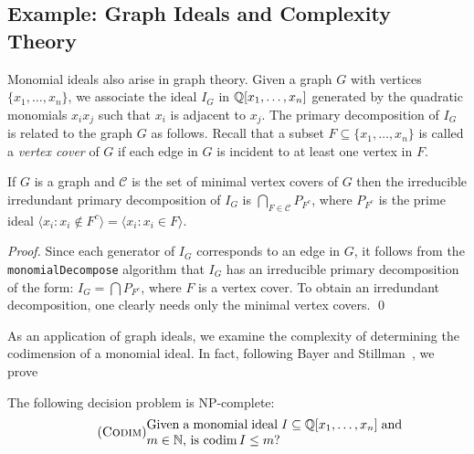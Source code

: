 \subsection*{Example: Graph Ideals and Complexity Theory}

Monomial ideals also arise in graph theory.  Given a graph $G$ with
vertices $\{x_{1}, \dotsc, x_{n}\}$, we associate the
ideal $I_{G}$ in ${\mathbb Q}[x_{1}, \dotsc, x_{n}]$
generated by the quadratic monomials $x_{i}x_{j}$ such that $x_{i}$ is
adjacent to $x_{j}$.  The primary decomposition of $I_{G}$ is related to
the graph $G$ as follows.  Recall that a subset $F \subseteq \{x_{1},
\dotsc, x_{n}\}$ is called a {\em vertex cover} of $G$ if each edge in $G$ is incident to at least
one vertex in $F$.

\begin{lemma} \label{lem:graphideal}
If $G$ is a graph and $\mathcal{C}$ is the set of minimal vertex
covers of $G$ then the irreducible irredundant primary
decomposition of $I_{G}$ is $\bigcap_{F
\in \mathcal{C}} P_{F^{c}}$, where $P_{F^{c}}$ is the prime ideal
$\langle x_{i} : x_{i} \not\in F^{c} \rangle =
\langle x_{i} : x_{i} \in F \rangle$.
\end{lemma}

\begin{proof}
Since each generator of $I_{G}$ corresponds to an edge in $G$, it
follows from the {\tt monomialDecompose} algorithm that $I_{G}$ has an
irreducible primary decomposition of the form: $I_{G} = \bigcap
P_{F^{c}}$, where $F$ is a vertex cover.  To obtain an
irredundant decomposition, one clearly needs only the minimal vertex
covers. \qed
\end{proof}

As an application of graph ideals, we examine the complexity of
determining the codimension of a monomial
ideal.  In fact, following Bayer and Stillman~\cite{MR94f:13018}, we
prove

\begin{proposition} \label{pro:complexity}
The following decision problem is NP-complete: 
\begin{equation} \tag{{\sc Codim}}
\text{\begin{minipage}[c]{200pt}
Given a monomial ideal $I \subseteq \bbbq[x_1, \dotsc, x_n]$
and $m \in \bbbn$, is $\codim I \leq m$?
\end{minipage}}
\end{equation}
\end{proposition}

